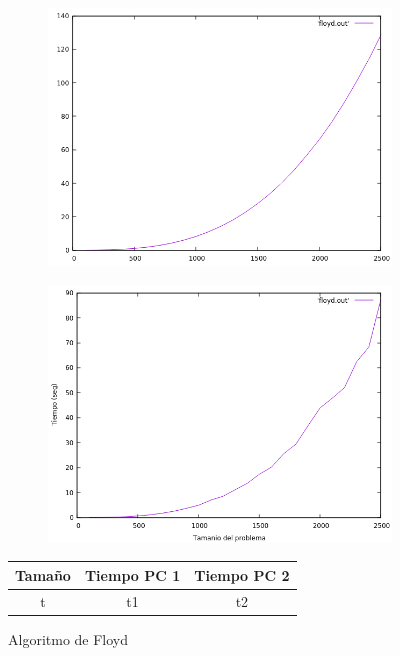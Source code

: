 \documentclass[12pt,spanish]{article}
\begin{document}
\begin{figure}[H]
\centering
\begin{subfigure}[b]{0.45\textwidth}
\includegraphics[scale=0.45]{empirica_floyd.png}
\caption{}
\end{subfigure}
\quad
\begin{subfigure}[b]{0.45\textwidth}
\includegraphics[scale=0.45]{empirica_floyd_2.png}
\caption{}
\end{subfigure}
\begin{tabular}{|c|c|c|}
\hline
\textbf{Tamaño} & \textbf{Tiempo PC 1} & \textbf{Tiempo PC 2} \\
\hline
t & t1 & t2 \\
\hline
\end{tabular}
\caption{Algoritmo de Floyd}
\end{figure}
\end{document}

